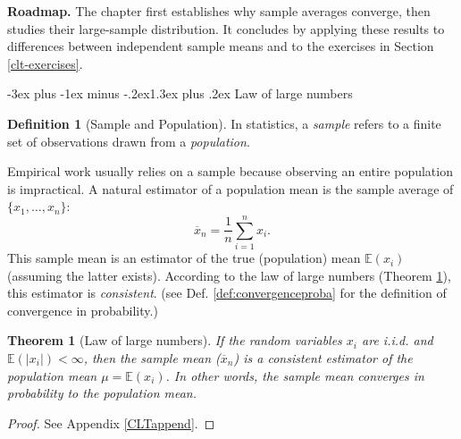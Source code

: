 \documentclass[
  11pt,
]{book}
\makeatletter
\renewcommand\section{\@startsection{section}{1}{\z@}
  {-3ex plus -1ex minus -.2ex}{1.3ex plus .2ex}
  {\normalfont\Large\bfseries\color{TextbookInk}}}
\newtheorem{theorem}{Theorem}[chapter]
\theoremstyle{definition}
\newtheorem{definition}{Definition}[chapter]
\theoremstyle{definition}
\theoremstyle{definition}
\theoremstyle{definition}
\theoremstyle{remark}
\makeatother
\begin{document}
\textbf{Roadmap.} The chapter first establishes why sample averages converge, then studies their large-sample distribution. It concludes by applying these results to differences between independent sample means and to the exercises in Section \ref{clt-exercises}.

\section{Law of large numbers}\label{law-of-large-numbers}

\begin{definition}[Sample and Population]
\protect\hypertarget{def:smplpop}{}\label{def:smplpop}In statistics, a \emph{sample} refers to a finite set of observations drawn from a \emph{population}.
\end{definition}

Empirical work usually relies on a sample because observing an entire population is impractical. A natural estimator of a population mean is the sample average of \(\{x_1,\dots,x_n\}\):
\[
\overline{x}_n = \frac{1}{n}\sum_{i=1}^n x_i.
\]
This sample mean is an estimator of the true (population) mean \(\mathbb{E}(x_i)\) (assuming the latter exists). According to the law of large numbers (Theorem \ref{thm:LLN}), this estimator is \emph{consistent}. (see Def. \ref{def:convergenceproba} for the definition of convergence in probability.)

\begin{theorem}[Law of large numbers]
\protect\hypertarget{thm:LLN}{}\label{thm:LLN}If the random variables \(x_i\) are i.i.d. and \(\mathbb{E}(|x_i|)<\infty\), then the sample mean (\(\overline{x}_n\)) is a consistent estimator of the population mean \(\mu=\mathbb{E}(x_i)\). In other words, the sample mean converges in probability to the population mean.
\end{theorem}

\begin{proof}
See Appendix \ref{CLTappend}.
\end{proof}
\end{document}
